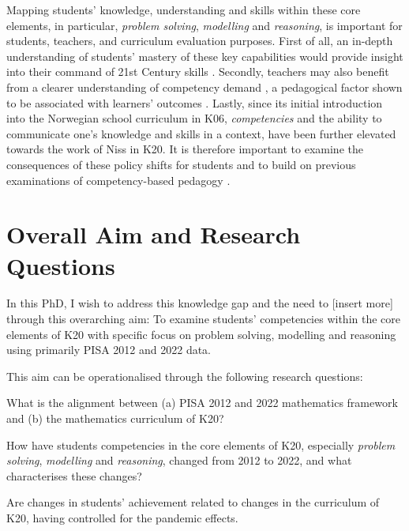 \documentclass[
    a4paper,                %
    11pt,                   %
    stu,                    %
    donotrepeattitle,       %
    floatsintext,           %
    biblatex,               %
    colorlinks=true,        %
    linkcolor=red,          %
    anchorcolor=black,      %
    citecolor=blue,         %
    urlcolor=blue,          %
    bookmarks=true,         %
    bookmarksopen=false,    %
    bookmarksnumbered=true, %
    dvipsnames              %
]{apa7}
\begin{document}
Mapping students' knowledge, understanding and skills within these core elements, in particular, \emph{problem solving}, \emph{modelling} and \emph{reasoning}, is important for students, teachers, and curriculum evaluation purposes. First of all, an in-depth understanding of students' mastery of these key capabilities would provide insight into their command of 21st Century skills \parencite[][p. 31]{oecd:2018}. Secondly, teachers may also benefit from a clearer understanding of competency demand \parencite{pettersen:2018}, a pedagogical factor shown to be associated with learners' outcomes \parencite{pettersen:2019}. Lastly, since its initial introduction into the Norwegian school curriculum in K06, \emph{competencies} and the ability to communicate one's knowledge and skills in a context, have been further elevated towards the work of Niss in K20. It is therefore important to examine the consequences of these policy shifts for students and to build on previous examinations of competency-based pedagogy \parencite[e.g., ][]{pettersen:2018}.




\section{Overall Aim and Research Questions}

In this PhD, I wish to address this knowledge gap and the need to [insert more] through this overarching aim: To examine students' competencies within the core elements of K20 with specific focus on problem solving, modelling and reasoning using primarily PISA 2012 and 2022 data.

This aim can be operationalised through the following research questions:
\begin{APAenumerate}
    \item What is the alignment between (a) PISA 2012 and 2022 mathematics framework and (b) the mathematics curriculum of K20?
    \item How have students competencies in the core elements of K20, especially \emph{problem solving}, \emph{modelling} and \emph{reasoning}, changed from  2012 to 2022, and what characterises these changes?
    \item Are changes in students' achievement related to changes in the curriculum of K20, having controlled for the pandemic effects.
\end{APAenumerate}
\end{document}
